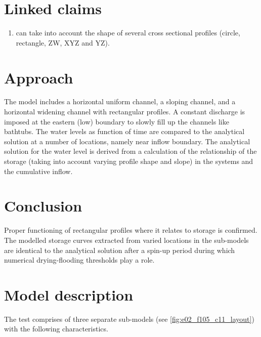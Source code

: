\section*{Linked claims}
\begin{enumerate}
\item \dflowfm can take into account the shape of several cross sectional profiles (circle, rectangle, ZW, XYZ and YZ).
\end{enumerate}

\section*{Approach}

The model includes a horizontal uniform channel, a sloping channel, and a horizontal widening channel with rectangular profiles.
A constant discharge is imposed at the eastern (low) boundary to slowly fill up the channels like bathtubs.
The water levels as function of time are compared to the analytical solution at a number of locations, namely near inflow boundary.
The analytical solution for the water level is derived from a calculation of the relationship of the storage (taking into account varying profile shape and slope) in the systems and the cumulative inflow.

\section*{Conclusion} 
Proper functioning of rectangular profiles where it relates to storage is confirmed. 
The modelled storage curves extracted from varied locations in the sub-models are identical to the analytical solution after a spin-up period during which numerical drying-flooding thresholds play a role.
\section*{Model description}

The test comprises of three separate sub-models (see \autoref{fig:e02_f105_c11_layout}) with the following characteristics.

